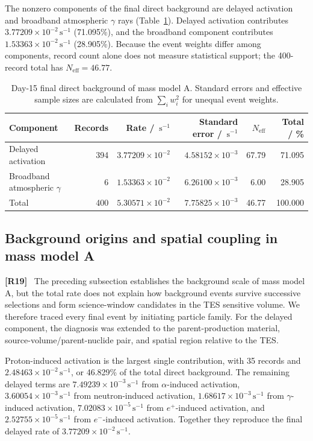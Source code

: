 \documentclass[11pt]{article}
\newcommand{\revmark}[1]{\textcolor{revisionblue}{\textbf{[R#1]}}\ }
\newcommand{\cps}{\ensuremath{\,\mathrm{s^{-1}}}}
\begin{document}
The nonzero components of the final direct background are delayed activation
and broadband atmospheric $\gamma$ rays
(Table~\ref{tab:reference_background_budget}). Delayed activation contributes
$3.77209\times10^{-2}\cps$ (71.095\%), and the broadband component contributes
$1.53363\times10^{-2}\cps$ (28.905\%). Because the event weights differ among
components, record count alone does not measure statistical support; the
400-record total has $N_{\mathrm{eff}}=46.77$.

\begin{table}[H]
\centering
\caption{Day-15 final direct background of mass model A. Standard errors and effective sample sizes are calculated from $\sum_i w_i^2$ for unequal event weights.}
\label{tab:reference_background_budget}
\footnotesize
\begin{tabular}{lrrrrr}
\toprule
Component & Records & Rate / $\cps$ & Standard error / $\cps$ & $N_{\mathrm{eff}}$ & Total / \% \\
\midrule
Delayed activation & 394 & $3.77209\times10^{-2}$ & $4.58152\times10^{-3}$ & 67.79 & 71.095 \\
Broadband atmospheric $\gamma$ & 6 & $1.53363\times10^{-2}$ & $6.26100\times10^{-3}$ & 6.00 & 28.905 \\
\midrule
Total & 400 & $5.30571\times10^{-2}$ & $7.75825\times10^{-3}$ & 46.77 & 100.000 \\
\bottomrule
\end{tabular}
\end{table}

\subsection{Background origins and spatial coupling in mass model A}
\label{subsec:mass_model_a_origins}

\revmark{19}
\begingroup
\color{revisionblue}
The preceding subsection establishes the background scale of mass model A, but the total rate does not explain how background events survive successive selections and form science-window candidates in the TES sensitive volume. We therefore traced every final event by initiating particle family. For the delayed component, the diagnosis was extended to the parent-production material, source-volume/parent-nuclide pair, and spatial region relative to the TES.

Proton-induced activation is the largest single contribution, with 35 records and $2.48463\times10^{-2}\cps$, or 46.829\% of the total direct background. The remaining delayed terms are $7.49239\times10^{-3}\cps$ from $\alpha$-induced activation, $3.60054\times10^{-3}\cps$ from neutron-induced activation, $1.68617\times10^{-3}\cps$ from $\gamma$-induced activation, $7.02083\times10^{-5}\cps$ from $e^+$-induced activation, and $2.52755\times10^{-5}\cps$ from $e^-$-induced activation. Together they reproduce the final delayed rate of $3.77209\times10^{-2}\cps$.
\end{document}
